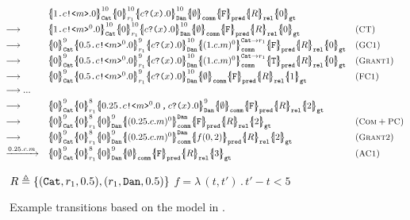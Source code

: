 \begin{figure}[t]
{\footnotesize
\[\hspace*{-1em}
\begin{array}{lll}
&
\pcellb{\qsend{1}{c}{m}.0}{10}{\cn{Cat}}
\pcellb{0}{10}{r_1}
\pcellb{\qrev{c}{x}.0}{10}{\cn{Dan}} 
\qcellb{\emptyset}{\cn{comm}}
\qcellb{\texttt{F}}{\cn{pred}}
\qcellb{R}{\cn{rel}}
\qcellb{0}{\cn{gt}}
&
\\[0.3em]
\longrightarrow
&
\pcellb{\qsend{1}{c}{m}^0.0}{10}{\cn{Cat}}
\pcellb{0}{10}{r_1}
\pcellb{\qrev{c}{x}.0}{10}{\cn{Dan}} 
\qcellb{\emptyset}{\cn{comm}}
\qcellb{\texttt{F}}{\cn{pred}}
\qcellb{R}{\cn{rel}}
\qcellb{0}{\cn{gt}}
&
(\rulelab{CT})
\\[0.3em]
\longrightarrow
&
\pcellb{0}{9}{\cn{Cat}}
\pcellb{\qsend{0.5}{c}{m}^0.0}{9}{r_1}
\pcellb{\qrev{c}{x}.0}{10}{\cn{Dan}} 
\pcellb{(1.c.m)^0}{\cn{Cat}\rightarrow r_1}{\cn{comm}}
\qcellb{\texttt{F}}{\cn{pred}}
\qcellb{R}{\cn{rel}}
\qcellb{0}{\cn{gt}}
&
(\rulelab{GC1})
\\[0.3em]
\longrightarrow
&
\pcellb{0}{9}{\cn{Cat}}
\pcellb{\qsend{0.5}{c}{m}^0.0}{9}{r_1}
\pcellb{\qrev{c}{x}.0}{10}{\cn{Dan}} 
\pcellb{(1.c.m)^0}{\cn{Cat}\rightarrow r_1}{\cn{comm}}
\qcellb{\texttt{T}}{\cn{pred}}
\qcellb{R}{\cn{rel}}
\qcellb{0}{\cn{gt}}
&
(\rulelab{Grant1})
\\[0.3em]
\longrightarrow
&
\pcellb{0}{9}{\cn{Cat}}
\pcellb{\qsend{0.5}{c}{m}^0.0}{9}{r_1}
\pcellb{\qrev{c}{x}.0}{10}{\cn{Dan}} 
\qcellb{\emptyset}{\cn{comm}}
\qcellb{\texttt{F}}{\cn{pred}}
\qcellb{R}{\cn{rel}}
\qcellb{1}{\cn{gt}}
&
(\rulelab{FC1})
\\[0.3em]
\longrightarrow ...
\\[0.3em]
\longrightarrow
&
\pcellb{0}{9}{\cn{Cat}}
\pcellb{0}{8}{r_1}
\pcellb{\pard{\qsend{0.25}{c}{m}^0.0}{\qrev{c}{x}.0}}{9}{\cn{Dan}} 
\qcellb{\emptyset}{\cn{comm}}
\qcellb{\texttt{F}}{\cn{pred}}
\qcellb{R}{\cn{rel}}
\qcellb{2}{\cn{gt}}
&
\\[0.3em]
\longrightarrow
&
\pcellb{0}{9}{\cn{Cat}}
\pcellb{0}{8}{r_1}
\pcellb{0}{9}{\cn{Dan}} 
\pcellb{(0.25.c.m)^0}{\cn{Dan}}{\cn{comm}}
\qcellb{\texttt{F}}{\cn{pred}}
\qcellb{R}{\cn{rel}}
\qcellb{2}{\cn{gt}}
&
(\rulelab{Com}+\rulelab{PC})
\\[0.3em]
\longrightarrow
&
\pcellb{0}{9}{\cn{Cat}}
\pcellb{0}{8}{r_1}
\pcellb{0}{9}{\cn{Dan}} 
\pcellb{(0.25.c.m)^0}{\cn{Dan}}{\cn{comm}}
\qcellb{f(0,2)}{\cn{pred}}
\qcellb{R}{\cn{rel}}
\qcellb{2}{\cn{gt}}
&
(\rulelab{Grant2})
\\[0.3em]
\xrightarrow{0.25.c.m}&
\pcellb{0}{9}{\cn{Cat}}
\pcellb{0}{8}{r_1}
\pcellb{0}{9}{\cn{Dan}} 
\qcellb{\emptyset}{\cn{comm}}
\qcellb{\texttt{F}}{\cn{pred}}
\qcellb{R}{\cn{rel}}
\qcellb{3}{\cn{gt}}
&
(\rulelab{AC1})
\end{array}
\]
}
{\footnotesize
\begin{center}
$R\triangleq\{(\texttt{Cat},r_1,0.5), (r_1,\texttt{Dan},0.5)\}$
\qquad
$f=\lambda\,(t,t')\,.\,t'-t<5$
\end{center}
}
\caption{Example transitions based on the model in .}
  \label{fig:q-pi-example1}
\end{figure}


